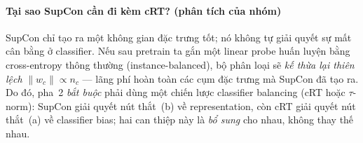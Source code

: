 \paragraph{Tại sao SupCon cần đi kèm cRT? \textnormal{(phân tích của nhóm)}}
SupCon chỉ tạo ra một không gian đặc trưng tốt; nó không tự giải quyết
sự mất cân bằng ở classifier.
Nếu sau pretrain ta gắn một linear probe huấn luyện bằng cross-entropy thông thường
(instance-balanced), bộ phân loại sẽ \emph{kế thừa lại thiên lệch} $\lVert w_c \rVert \propto n_c$
--- lãng phí hoàn toàn các cụm đặc trưng mà SupCon đã tạo ra.
Do đó, pha~2 \emph{bắt buộc} phải dùng một chiến lược classifier balancing
(cRT hoặc $\tau$-norm): SupCon giải quyết nút thắt~(b) về representation,
còn cRT giải quyết nút thắt~(a) về classifier bias;
hai can thiệp này là \emph{bổ sung} cho nhau, không thay thế nhau.



